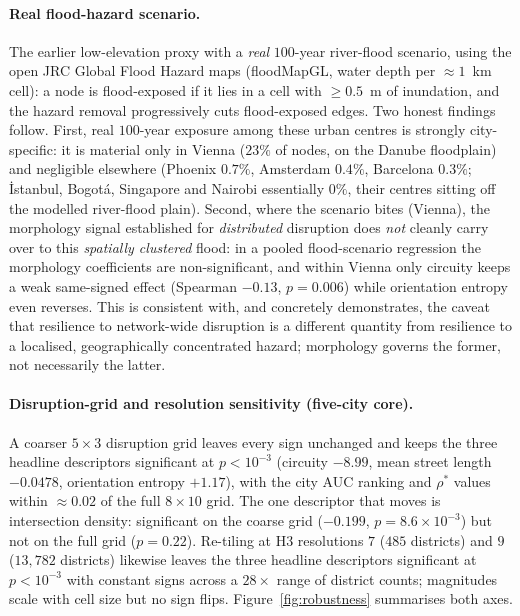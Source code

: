 \documentclass[sn-mathphys-num,pdflatex]{sn-jnl}
\newcommand{\rhostar}{\rho^{*}}
\begin{document}
\paragraph{Real flood-hazard scenario.} The earlier low-elevation
proxy with a \emph{real} $100$-year river-flood scenario, using the open JRC Global
Flood Hazard maps \citep{dottori2016globalflood} (floodMapGL, water depth per
$\approx1$~km cell): a node is flood-exposed if it lies in a cell with $\ge0.5$~m of
inundation, and the hazard removal progressively cuts flood-exposed edges. Two
honest findings follow. First, real $100$-year exposure among these urban centres is
strongly city-specific: it is material only in Vienna ($23\%$ of nodes, on the
Danube floodplain) and negligible elsewhere (Phoenix $0.7\%$, Amsterdam $0.4\%$,
Barcelona $0.3\%$; İstanbul, Bogotá, Singapore and Nairobi essentially $0\%$, their
centres sitting off the modelled river-flood plain). Second, where the scenario
bites (Vienna), the morphology signal established for \emph{distributed} disruption
does \emph{not} cleanly carry over to this \emph{spatially clustered} flood: in a
pooled flood-scenario regression the morphology coefficients are non-significant,
and within Vienna only circuity keeps a weak same-signed effect (Spearman $-0.13$,
$p=0.006$) while orientation entropy even reverses. This is consistent with, and
concretely demonstrates, the caveat that resilience to network-wide disruption is a
different quantity from resilience to a localised, geographically concentrated
hazard; morphology governs the former, not necessarily the latter.

\paragraph{Disruption-grid and resolution sensitivity (five-city core).} A coarser $5\times3$
disruption grid leaves every sign unchanged and keeps the three headline descriptors
significant at $p<10^{-3}$ (circuity $-8.99$, mean street length $-0.0478$,
orientation entropy $+1.17$), with the city AUC ranking and $\rhostar$ values within
$\approx0.02$ of the full $8\times10$ grid. The one descriptor that moves is
intersection density: significant on the coarse grid ($-0.199$,
$p=8.6\times10^{-3}$) but not on the full grid ($p=0.22$). Re-tiling at H3
resolutions $7$ ($485$ districts) and $9$ ($13{,}782$ districts) likewise leaves the
three headline descriptors significant at $p<10^{-3}$ with constant signs across a
$28\times$ range of district counts; magnitudes scale with cell size but no sign
flips. Figure~\ref{fig:robustness} summarises both axes.
\end{document}
